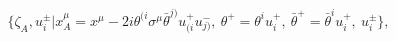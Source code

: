 \begin{equation}
\{\zeta_A,u_i^{\pm}|x_A^\mu=x^\mu 
  - 2 i \theta^{(i}\sigma^\mu {\bar{\theta}}^{j)}u_{(i}^+u_{j)}^-,
  ~\theta^+ = \theta^i u_i^+,
  ~{\bar{\theta}}^+ = {\bar{\theta}}^i u_i^{+},
  ~u_i^{\pm}\},
\end{equation}


